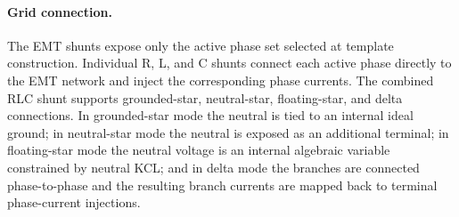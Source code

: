 \paragraph{Grid connection.}
The EMT shunts expose only the active phase set selected at template construction. Individual R, L, and C shunts connect each active phase directly to the EMT network and inject the corresponding phase currents. The combined RLC shunt supports grounded-star, neutral-star, floating-star, and delta connections. In grounded-star mode the neutral is tied to an internal ideal ground; in neutral-star mode the neutral is exposed as an additional terminal; in floating-star mode the neutral voltage is an internal algebraic variable constrained by neutral KCL; and in delta mode the branches are connected phase-to-phase and the resulting branch currents are mapped back to terminal phase-current injections.

